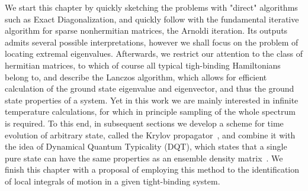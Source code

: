 We start this chapter by quickly sketching the problems with "direct" algorithms such as Exact Diagonalization, and quickly
follow with the fundamental iterative algorithm for sparse nonhermitian matrices, the Arnoldi iteration. Its outputs admits several
possible interpretations, however we shall focus on the problem of locating extremal eigenvalues.
Afterwards, we restrict our attention to the class of hermitian matrices, to which of course all typical tigh-binding Hamiltonians
belong to, and describe the Lanczos algorithm, which allows for efficient calculation of the ground state eigenvalue and eigenvector,
and thus the ground state properties of a system.
Yet in this work we are mainly interested in infinite temperature calculations, for which in principle sampling of the whole
spectrum is required. To this end, in subsequent sections we develop a scheme for time evolution of arbitrary state,
called the Krylov propagator~\autocite{Park1986}, and combine it with the idea of Dynamical Quantum Typicality (DQT),
which states that a single pure state can have the same properties as an ensemble density matrix~\autocite{Gemmer2003,Goldstein2006,Popescu2006}.
We finish this chapter with a proposal of employing this method to the identification of local integrals of motion in a given
tight-binding system\autocite{Mierzejewski2015a}.


